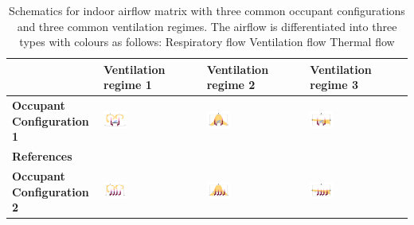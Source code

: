 \documentclass[a4paper,12pt]{elsarticle}
\DeclareRobustCommand{\legendsquare}[1]{%
  \tikz[baseline=(a.south)]{\node[#1, inner sep=.8ex, outer sep=0] (a) {};}%
  }
\begin{document}
\begin{table}[ht]
    \caption{Schematics for indoor airflow matrix with three common occupant configurations and three common ventilation regimes. The airflow is differentiated into three types with colours as follows: \legendsquare{fill=resp} Respiratory flow \legendsquare{fill=vent} Ventilation flow \legendsquare{fill=therm} Thermal flow }
    \label{tab:mat}
    \centering
    \begin{tabular}{|m{2.5cm}|m{4cm}|m{4cm}|m{4cm}|}
    \hline
     & \textbf{Ventilation regime 1} & \textbf{Ventilation regime 2} & \textbf{Ventilation regime 3} \\
    \hline
    \textbf{Occupant Configuration 1} & \includegraphics[clip,trim={0 2cm 0 2cm},width=0.25\textwidth]{Airflow/mat1.jpeg}& \includegraphics[clip,trim={0 2cm 0 2cm},width=0.25\textwidth]{Airflow/mat4.jpeg}& \includegraphics[clip,trim={0 2cm 0 2cm},width=0.25\textwidth]{Airflow/mat7.jpeg} \\
    \hline
    \textbf{References} & \cite{li2020investigating,zhou2021experimental,pan2022boundary,pan2023predicting,li2022airborne} & \cite{deng2021control,zhou2021experimental,wu2023numerical} & \cite{pendar2020numerical,feng2020influence} \\
    \hline
    \textbf{Occupant Configuration 2} &\includegraphics[clip,trim={0 2cm 0 2cm},width=0.25\textwidth]{Airflow/mat2.jpeg}& \includegraphics[clip,trim={0 2cm 0 2cm},width=0.25\textwidth]{Airflow/mat5.jpeg}& \includegraphics[clip,trim={0 2cm 0 2cm},width=0.25\textwidth]{Airflow/mat8.jpeg} \\

\end{tabular}
\end{table}
\end{document}
